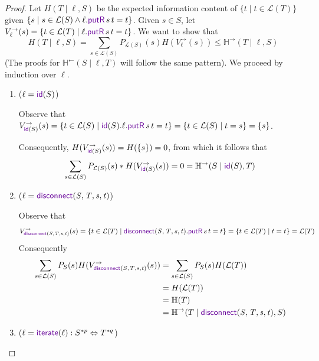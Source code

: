 \documentclass[acmsmall,screen,anonymous]{acmart}
\begin{document}
\begin{proof}
Let $H(T \; | \; \ell, S)$ be the expected information content of $\{t \; | \; t \in \mathcal{L}(T)\}$ given $\{s \; | \; s \in \mathcal{L}(S) \wedge \ell.\PutROf{s}{t} = t\}$. Given $s \in S$, let $V^{\rightarrow}_{\ell}(s) = \{t \in \mathcal{L}(T) \; | \; \ell.\PutROf{s}{t} = t\}$. We want to show that
$$H(T \; | \; \ell, S) = \sum_{s \in \mathcal{L}(S)}P_{\mathcal{L}(S)}(s)H(V^{\rightarrow}_{\ell}(s)) \leq \mathbb{H}^{\rightarrow}(T \; | \; \ell, S)$$
(The proofs for $\mathbb{H}^{\leftarrow}(S \; | \; \ell, T)$ will follow the same pattern). We proceed by induction over $\ell$. 
\begin{enumerate}
\item
($\ell = \IdentityLensOf{S}$)

Observe that $V^{\rightarrow}_{\IdentityLensOf{S}}(s) = \{t \in \mathcal{L}(S) \; | \; \IdentityLensOf{S}.\ell.\PutROf{s}{t} = t\} = \{t \in \mathcal{L}(S) \; | \; t = s\} = \{s\}$.

Consequently, $H(V^{\rightarrow}_{\IdentityLensOf{S}}(s)) = H(\{s\}) = 0$, from which it follows that 
$$\sum_{s \in \mathcal{L}(S)} P_{\mathcal{L}(S)}(s) * H(V^{\rightarrow}_{\IdentityLensOf{S}}(s)) = 0 = \mathbb{H}^{\rightarrow}(S \; | \; \IdentityLensOf{S}, T)$$
\item
($\ell = \DisconnectOf{\Regex}{\RegexAlt}{\String}{\StringAlt}$)

Observe that 
$$V^{\rightarrow}_{\DisconnectOf{\Regex}{\RegexAlt}{\String}{\StringAlt}}(s) = \{t \in \mathcal{L}(T) \; | \; \DisconnectOf{\Regex}{\RegexAlt}{\String}{\StringAlt}.\PutROf{s}{t} = t\} = \{t \in \mathcal{L}(T) \; | \; t = t\} = \mathcal{L}(T)$$
Consequently
\begin{align*}
\sum_{s \in \mathcal{L}(S)}P_{S}(s)H(V^{\rightarrow}_{\DisconnectOf{\Regex}{\RegexAlt}{\String}{\StringAlt}}(s)) &= \sum_{s \in \mathcal{L}(S)}P_{S}(s)H(\mathcal{L}(T))\\
&= H(\mathcal{L}(T))\\
&= \mathbb{H}(T)\\
&= \mathbb{H}^{\rightarrow}(T \; | \; \DisconnectOf{\Regex}{\RegexAlt}{\String}{\StringAlt}, S)
\end{align*}
\item
($\ell = \IterateLensOf{\Lens} : S^{*p} \Leftrightarrow T^{*q}$)


\end{enumerate}
\end{proof}
\end{document}
